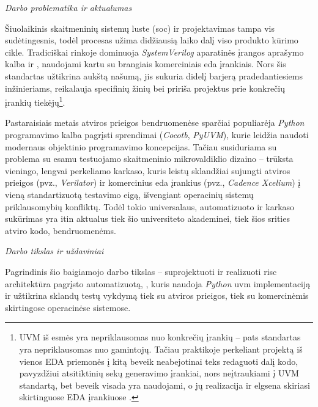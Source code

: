 
\textit{Darbo problematika ir aktualumas}

Šiuolaikinis skaitmeninių sistemų luste (\gls{soc}) ir  projektavimas tampa vis sudėtingesnis, todėl  procesas užima didžiausią laiko dalį viso produkto kūrimo cikle. Tradiciškai rinkoje dominuoja \textit{SystemVerilog} aparatinės įrangos aprašymo kalba ir , naudojami kartu su brangiais komerciniais \gls{eda} įrankiais. Nors šis standartas užtikrina aukštą našumą, jis sukuria didelį barjerą pradedantiesiems inžinieriams, reikalauja specifinių žinių bei pririša projektus prie konkrečių įrankių tiekėjų\footnote{UVM iš esmės yra nepriklausomas nuo konkrečių įrankių – pats standartas yra nepriklausomas nuo gamintojų. Tačiau praktikoje perkeliant projektą iš vienos EDA priemonės į kitą beveik neabejotinai teks redaguoti dalį kodo, pavyzdžiui atsitiktinių sekų generavimo įrankiai, nors neįtraukiami į UVM standartą, bet beveik visada yra naudojami, o jų realizacija ir elgsena skiriasi skirtinguose EDA įrankiuose \cite{cadence} \cite{synopsis}.}. 

Pastaraisiais metais atviros prieigos bendruomenėse sparčiai populiarėja \textit{Python} programavimo kalba pagrįsti  sprendimai (\textit{Cocotb}, \textit{PyUVM}), kurie leidžia naudoti modernaus objektinio programavimo koncepcijas. Tačiau susiduriama su problema su esamu testuojamo skaitmeninio mikrovaldiklio dizaino -- trūksta vieningo, lengvai perkeliamo karkaso, kuris leistų sklandžiai sujungti atviros prieigos  (pvz., \textit{Verilator}) ir komercinius \gls{eda} įrankius (pvz., \textit{Cadence Xcelium}) į vieną standartizuotą testavimo eigą, išvengiant operacinių sistemų priklausomybių konfliktų. Todėl tokio universalaus, automatizuoto ir   karkaso sukūrimas yra itin aktualus tiek šio universiteto akademinei, tiek šios srities atviro kodo, bendruomenėms.

\textit{Darbo tikslas ir uždaviniai}

Pagrindinis šio baigiamojo darbo tikslas -- suprojektuoti ir realizuoti \gls{risc} architektūra pagrįsto  automatizuotą,   , kuris naudoja \textit{Python} \gls{uvm} implementaciją ir užtikrina sklandų testų vykdymą tiek su atviros prieigos, tiek su komercinėmis  skirtingose operacinėse sistemose.


